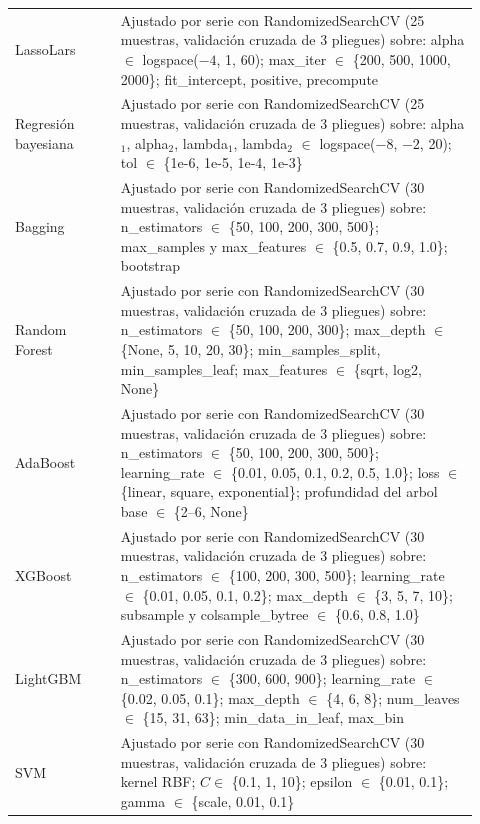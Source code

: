\begin{longtable}{>{\raggedright\arraybackslash}p{0.21\linewidth}>{\raggedright\arraybackslash}p{0.71\linewidth}}
\hspace{.6em}LassoLars & Ajustado por serie con RandomizedSearchCV (25 muestras, validación cruzada de 3 pliegues) sobre: alpha $\in$ logspace($-4$, 1, 60); max\_iter $\in$ \{200, 500, 1000, 2000\}; fit\_intercept, positive, precompute \\
\hspace{.6em}Regresión bayesiana & Ajustado por serie con RandomizedSearchCV (25 muestras, validación cruzada de 3 pliegues) sobre: alpha$_1$, alpha$_2$, lambda$_1$, lambda$_2$ $\in$ logspace($-8$, $-2$, 20); tol $\in$ \{1e-6, 1e-5, 1e-4, 1e-3\} \\
\hspace{.6em}Bagging & Ajustado por serie con RandomizedSearchCV (30 muestras, validación cruzada de 3 pliegues) sobre: n\_estimators $\in$ \{50, 100, 200, 300, 500\}; max\_samples y max\_features $\in$ \{0.5, 0.7, 0.9, 1.0\}; bootstrap \\
\hspace{.6em}Random Forest & Ajustado por serie con RandomizedSearchCV (30 muestras, validación cruzada de 3 pliegues) sobre: n\_estimators $\in$ \{50, 100, 200, 300\}; max\_depth $\in$ \{None, 5, 10, 20, 30\}; min\_samples\_split, min\_samples\_leaf; max\_features $\in$ \{sqrt, log2, None\} \\
\hspace{.6em}AdaBoost & Ajustado por serie con RandomizedSearchCV (30 muestras, validación cruzada de 3 pliegues) sobre: n\_estimators $\in$ \{50, 100, 200, 300, 500\}; learning\_rate $\in$ \{0.01, 0.05, 0.1, 0.2, 0.5, 1.0\}; loss $\in$ \{linear, square, exponential\}; profundidad del arbol base $\in$ \{2--6, None\} \\
\hspace{.6em}XGBoost & Ajustado por serie con RandomizedSearchCV (30 muestras, validación cruzada de 3 pliegues) sobre: n\_estimators $\in$ \{100, 200, 300, 500\}; learning\_rate $\in$ \{0.01, 0.05, 0.1, 0.2\}; max\_depth $\in$ \{3, 5, 7, 10\}; subsample y colsample\_bytree $\in$ \{0.6, 0.8, 1.0\} \\
\hspace{.6em}LightGBM & Ajustado por serie con RandomizedSearchCV (30 muestras, validación cruzada de 3 pliegues) sobre: n\_estimators $\in$ \{300, 600, 900\}; learning\_rate $\in$ \{0.02, 0.05, 0.1\}; max\_depth $\in$ \{4, 6, 8\}; num\_leaves $\in$ \{15, 31, 63\}; min\_data\_in\_leaf, max\_bin \\
\hspace{.6em}SVM & Ajustado por serie con RandomizedSearchCV (30 muestras, validación cruzada de 3 pliegues) sobre: kernel RBF; $C \in$ \{0.1, 1, 10\}; epsilon $\in$ \{0.01, 0.1\}; gamma $\in$ \{scale, 0.01, 0.1\} \\

\end{longtable}
